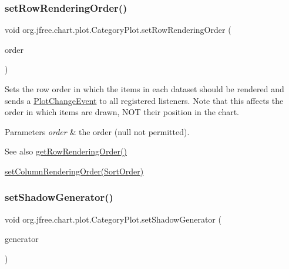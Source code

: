 \subsubsection{\texorpdfstring{set\+Row\+Rendering\+Order()}{setRowRenderingOrder()}}
{\footnotesize\ttfamily void org.\+jfree.\+chart.\+plot.\+Category\+Plot.\+set\+Row\+Rendering\+Order (\begin{DoxyParamCaption}\item[{Sort\+Order}]{order }\end{DoxyParamCaption})}

Sets the row order in which the items in each dataset should be rendered and sends a \mbox{\hyperlink{}{Plot\+Change\+Event}} to all registered listeners. Note that this affects the order in which items are drawn, N\+OT their position in the chart.


\begin{DoxyParams}{Parameters}
{\em order} & the order ({\ttfamily null} not permitted).\\
\hline
\end{DoxyParams}
\begin{DoxySeeAlso}{See also}
\mbox{\hyperlink{classorg_1_1jfree_1_1chart_1_1plot_1_1_category_plot_a64430e6feca3cbcf5ef475e3c34b488e}{get\+Row\+Rendering\+Order()}} 

\mbox{\hyperlink{classorg_1_1jfree_1_1chart_1_1plot_1_1_category_plot_a2c7648bb5408634ddf9af63510c52773}{set\+Column\+Rendering\+Order(\+Sort\+Order)}} 
\end{DoxySeeAlso}
\mbox{\label{classorg_1_1jfree_1_1chart_1_1plot_1_1_category_plot_ac965167ef493598b809f6c6c12ccfd93}} 
\subsubsection{\texorpdfstring{set\+Shadow\+Generator()}{setShadowGenerator()}}
{\footnotesize\ttfamily void org.\+jfree.\+chart.\+plot.\+Category\+Plot.\+set\+Shadow\+Generator (\begin{DoxyParamCaption}\item[{\mbox{\hyperlink{interfaceorg_1_1jfree_1_1chart_1_1util_1_1_shadow_generator}{Shadow\+Generator}}}]{generator }\end{DoxyParamCaption})}

